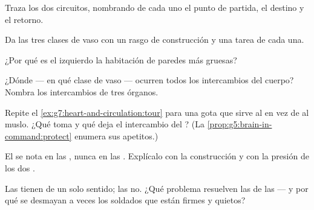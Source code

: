 \begin{exercise}[$\star$]\label{exo:g7:heart-and-circulation:3}
Traza los dos circuitos, nombrando de cada uno el punto de partida, el
destino y el retorno.
\end{exercise}

\begin{exercise}[$\star$]\label{exo:g7:heart-and-circulation:4}
Da las tres clases de vaso con un rasgo de construcción y una tarea de
cada una.
\end{exercise}

\begin{exercise}[$\star$]\label{exo:g7:heart-and-circulation:5}
¿Por qué es el  izquierdo la habitación de paredes más gruesas?
\end{exercise}

\begin{exercise}[$\star$]\label{exo:g7:heart-and-circulation:6}
¿Dónde --- en qué clase de vaso --- ocurren todos los intercambios del
cuerpo? Nombra los intercambios  de tres órganos.
\end{exercise}

\begin{exercise}[$\star\star$]\label{exo:g7:heart-and-circulation:7}
Repite el \cref{ex:g7:heart-and-circulation:tour} para una gota que
sirve al  en vez de al muslo. ¿Qué toma y qué deja el
intercambio  del ? (La
\cref{prop:g5:brain-in-command:protect} enumera sus apetitos.)
\end{exercise}

\begin{exercise}[$\star\star$]\label{exo:g7:heart-and-circulation:8}
El  se nota en las , nunca en las . Explícalo con la
construcción y con la presión de los dos .
\end{exercise}

\begin{exercise}[$\star\star$]\label{exo:g7:heart-and-circulation:9}
Las  tienen  de un solo sentido; las  no. ¿Qué
problema resuelven las  de las  --- y por qué se desmayan
a veces los soldados que están firmes y quietos?
\end{exercise}

